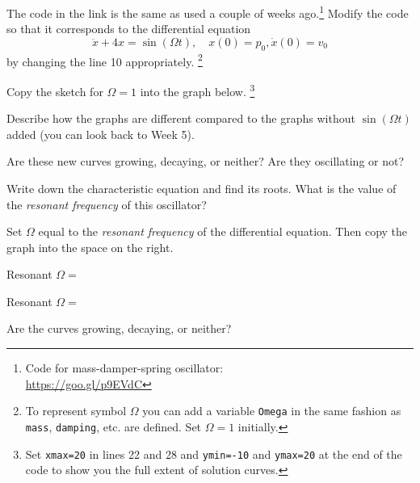 \begin{sagequestion}
  The \sage code in the link is the same as used a couple of weeks ago.\footnote{Code for mass-damper-spring oscillator: \\ \url{https://goo.gl/p9EVdC}} Modify the code so that it corresponds to the differential equation
  \begin{equation}
    \label{eq:w7-1}
    \ddot x + 4 x = \sin( \Omega t ),\quad x(0)=p_{0}, \dot x(0) = v_{0}
  \end{equation}
  by changing the line 10 appropriately. \footnote{To represent symbol \(\Omega\) you can add a variable \texttt{Omega} in the same fashion as \texttt{mass}, \texttt{damping}, etc. are defined. Set \(\Omega=1\) initially.}
  \begin{enumerate}[(a)]

  \item Copy the sketch for \(\Omega=1\) into the graph below. \footnote{Set \texttt{xmax=20} in lines 22 and 28 and \texttt{ymin=-10} and \texttt{ymax=20} at the end of the code to show you the full extent of solution curves.}

    \begin{minipage}{0.48\linewidth}
  \end{minipage}
    \begin{minipage}{0.48\linewidth}
  \item Describe how the graphs are different compared to the graphs without \(\sin(\Omega t)\) added (you can look back to Week 5).
  \solspace{0.25in}

\item Are these new curves growing, decaying, or neither? Are they oscillating or not?
  \solspace{0.25in}
\end{minipage}
\item Write down the characteristic equation and find its roots. What is the value of the \emph{resonant frequency} of this oscillator?
  \solspace{.5in}

\begin{minipage}{0.48\linewidth}
\item Set \(\Omega\) equal to the \emph{resonant frequency} of the differential equation. Then copy the graph into the space on the right.

  Resonant \(\Omega = \)
\end{minipage} \begin{minipage}{0.48\linewidth}
  \begin{center}
    Resonant \(\Omega = \)


    \vspace{1em}
        Are the curves growing, decaying, or neither? 
    \end{center}
  \end{minipage}
\end{enumerate}

\end{sagequestion}


